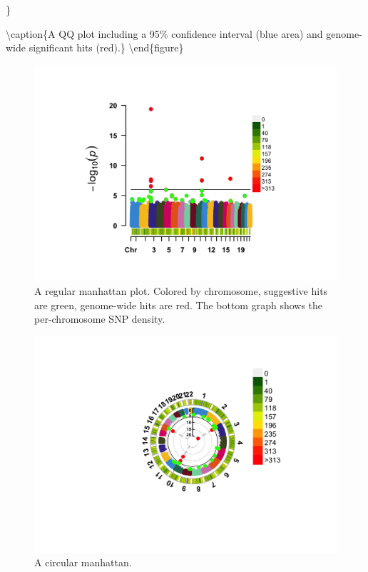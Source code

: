 \documentclass[
]{book}
\begin{document}
\}

\textbackslash caption\{A QQ plot including a 95\% confidence interval (blue area) and genome-wide significant hits (red).\}\label{fig:show-cmplot-all-qq}
\textbackslash end\{figure\}

\begin{figure}

{\centering \includegraphics[width=18.67in]{img/_gwas/show-cmplot-all-manhattan} 

}

\caption{A regular manhattan plot. Colored by chromosome, suggestive hits are green, genome-wide hits are red. The bottom graph shows the per-chromosome SNP density.}\label{fig:show-cmplot-all-manhattan}
\end{figure}

\begin{figure}

{\centering \includegraphics[width=18.67in]{img/_gwas/show-cmplot-all-circular} 

}

\caption{A circular manhattan.}\label{fig:show-cmplot-all-circular}
\end{figure}
\end{document}
